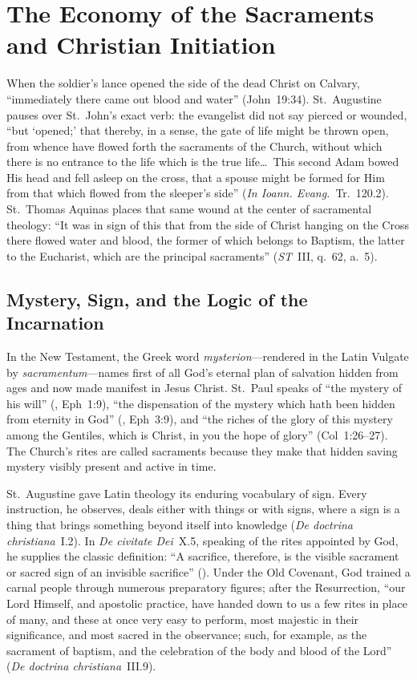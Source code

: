 \section{The Economy of the Sacraments and Christian Initiation}
\label{sec:initiation-introduction}

When the soldier's lance opened the side of the dead Christ on Calvary, ``immediately there came out blood and water'' (John~19:34). St.~Augustine pauses over St.~John's exact verb: the evangelist did not say pierced or wounded, ``but `opened;' that thereby, in a sense, the gate of life might be thrown open, from whence have flowed forth the sacraments of the Church, without which there is no entrance to the life which is the true life\ldots\ This second Adam bowed His head and fell asleep on the cross, that a spouse might be formed for Him from that which flowed from the sleeper's side'' (\emph{In Ioann. Evang.}~Tr.~120.2). St.~Thomas Aquinas places that same wound at the center of sacramental theology: ``It was in sign of this that from the side of Christ hanging on the Cross there flowed water and blood, the former of which belongs to Baptism, the latter to the Eucharist, which are the principal sacraments'' (\emph{ST}~III, q.~62, a.~5).

\subsection{Mystery, Sign, and the Logic of the Incarnation}
\label{subsec:mystery-sign-incarnation}

In the New Testament, the Greek word \emph{mysterion}---rendered in the Latin Vulgate by \emph{sacramentum}---names first of all God's eternal plan of salvation hidden from ages and now made manifest in Jesus Christ. St.~Paul speaks of ``the mystery of his will'' (, Eph~1:9), ``the dispensation of the mystery which hath been hidden from eternity in God'' (, Eph~3:9), and ``the riches of the glory of this mystery among the Gentiles, which is Christ, in you the hope of glory'' (Col~1:26--27). The Church's rites are called sacraments because they make that hidden saving mystery visibly present and active in time.

St.~Augustine gave Latin theology its enduring vocabulary of sign. Every instruction, he observes, deals either with things or with signs, where a sign is a thing that brings something beyond itself into knowledge (\emph{De doctrina christiana}~I.2). In \emph{De civitate Dei}~X.5, speaking of the rites appointed by God, he supplies the classic definition: ``A sacrifice, therefore, is the visible sacrament or sacred sign of an invisible sacrifice'' (). Under the Old Covenant, God trained a carnal people through numerous preparatory figures; after the Resurrection, ``our Lord Himself, and apostolic practice, have handed down to us a few rites in place of many, and these at once very easy to perform, most majestic in their significance, and most sacred in the observance; such, for example, as the sacrament of baptism, and the celebration of the body and blood of the Lord'' (\emph{De doctrina christiana}~III.9).

